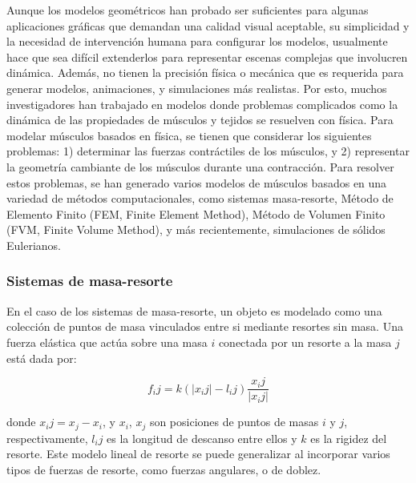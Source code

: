 Aunque los modelos geométricos han probado ser suficientes para algunas aplicaciones gráficas que demandan una calidad visual aceptable, su simplicidad y la necesidad de intervención humana para configurar los modelos, usualmente hace que sea difícil extenderlos para representar escenas complejas que involucren dinámica. Además, no tienen la precisión física o mecánica que es requerida para generar modelos, animaciones, y simulaciones más realistas. Por esto, muchos investigadores han trabajado en modelos donde problemas complicados como la dinámica de las propiedades de músculos y tejidos se resuelven con física. Para modelar músculos basados en física, se tienen que considerar los siguientes problemas: 1) determinar las fuerzas contráctiles de los músculos, y 2) representar la geometría cambiante de los músculos durante una contracción. Para resolver estos problemas, se han generado varios modelos de músculos basados en una variedad de métodos computacionales, como sistemas masa-resorte, Método de Elemento Finito (FEM, Finite Element Method), Método de Volumen Finito (FVM, Finite Volume Method), y más recientemente, simulaciones de sólidos Eulerianos.

\subsubsection{Sistemas de masa-resorte}

En el caso de los sistemas de masa-resorte, un objeto es modelado como una colección de puntos de masa vinculados entre si mediante resortes sin masa. Una fuerza elástica que actúa sobre una masa $i$ conectada por un resorte a la masa $j$ está dada por:

\begin{equation}
	f_ij = k(|x_ij| -l_ij)\frac{x_ij}{|x_ij|}
\end{equation}

donde $x_ij = x_j - x_i$, y $x_i$, $x_j$ son posiciones de puntos de masas $i$ y $j$, respectivamente, $l_ij$ es la longitud de descanso entre ellos y $k$ es la rigidez del resorte. Este modelo lineal de resorte se puede generalizar al incorporar varios tipos de fuerzas de resorte, como fuerzas angulares, o de doblez. 

